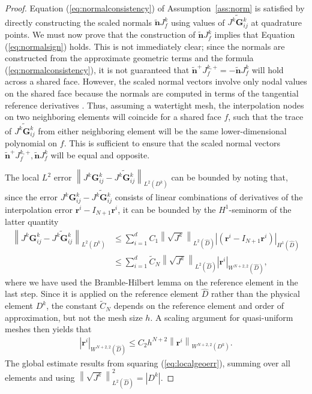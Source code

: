 \documentclass[preprint,10pt]{article}
\theoremstyle{definition}
\theoremstyle{lemma}
\theoremstyle{theorem}
\theoremstyle{assumption}
\renewcommand{\hat}{\widehat}
\renewcommand{\tilde}{\widetilde}
\newcommand{\nor}[1]{\left\| #1 \right\|}
\newcommand{\LRp}[1]{\left( #1 \right)}
\newcommand{\LRb}[1]{\left| #1 \right|}
\newcommand{\Grad} {\ensuremath{\nabla}}
\begin{document}
{\begin{proof}
Equation (\ref{eq:normalconsistency}) of Assumption~\ref{ass:norm} is satisfied by directly constructing the scaled normals $\tilde{\bm{n}}J^k_f$ using values of $\tilde{J^k\bm{G}^k_{ij}}$ at quadrature points.  We must now prove that the construction of $\tilde{\bm{n}}J^k_f$ implies that Equation (\ref{eq:normalsign}) holds. This is not immediately clear; since the normals are constructed from the approximate geometric terms and the formula (\ref{eq:normalconsistency}), it is not guaranteed that $\tilde{\bm{n}}^+J^{k,+}_f = -\tilde{\bm{n}}J^k_f$ will hold across a shared face.  However, the scaled normal vectors involve only nodal values on the shared face because the normals are computed in terms of the tangential reference derivatives \cite{kopriva2006metric}.  Thus, assuming a watertight mesh, the interpolation nodes on two neighboring elements will coincide for a shared face $f$, such that the trace of $\tilde{J^k\bm{G}^k_{ij}}$ from either neighboring element will be the same lower-dimensional polynomial on $f$.  This is sufficient to ensure that the scaled normal vectors $\tilde{\bm{n}}^+J^{k,+}_f, \tilde{\bm{n}}J^k_f$ will be equal and opposite.  

The local $L^2$ error $\nor{{J^k\bm{G}^k_{ij}}-\tilde{J^k\bm{G}^k_{ij}}}_{L^2\LRp{D^k}}$ can be bounded by noting that, since the error $J^k\bm{G}^k_{ij}-\tilde{J^k\bm{G}^k_{ij}}$ consists of linear combinations of derivatives of the interpolation error $\bm{r}^i-I_{N+1}\bm{r}^i$, it can be bounded by the $H^1$-seminorm of the latter quantity
\begin{align*}
\nor{{J^k\bm{G}^k_{ij}}-\tilde{J^k\bm{G}^k_{ij}}}_{L^2\LRp{D^k}} &\leq %
 \sum_{i=1}^d C_1 \nor{\sqrt{J^k}}_{L^2\LRp{\hat{D}}} \LRb{\LRp{\bm{r}^i-I_{N+1}\bm{r}^i}}_{H^1\LRp{\hat{D}}}\\
 &\leq  \sum_{i=1}^d \tilde{C}_N \nor{\sqrt{J^k}}_{L^2\LRp{\hat{D}}} \LRb{\bm{r}^i}_{W^{N+2,2}\LRp{\hat{D}}},
\end{align*}
where we have used the Bramble-Hilbert lemma \cite{brenner2007mathematical} on the reference element in the last step.  Since it is applied on the reference element $\hat{D}$ rather than the physical element $D^k$, the constant $\tilde{C}_N$ depends on the reference element and order of approximation, but not the mesh size $h$.  A scaling argument for quasi-uniform meshes then yields that
\begin{align}
\LRb{\bm{r}^i}_{W^{N+2,2}\LRp{\hat{D}}} \leq C_2 h^{N+2}\nor{\bm{r}^i}_{W^{N+2,2}\LRp{D^k}}.
\label{eq:localgeoerr}
\end{align}
The global estimate results from squaring (\ref{eq:localgeoerr}), summing over all elements and using $\nor{\sqrt{J^k}}^2_{L^2\LRp{\hat{D}}} = \LRb{D^k}$.
\end{proof}

}
\end{document}
